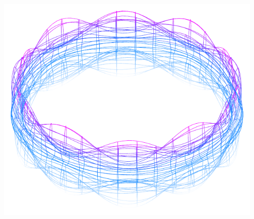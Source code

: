 \documentclass[11pt,openany]{article}
\begin{document}
\begin{center}
\begin{minipage}{.32\textwidth}
	\includegraphics[scale=.525]{../tikz/grad-math-tikz-pdf/torus5.pdf}
\end{minipage}\hfill
\end{center}
\vfill
\end{document}
